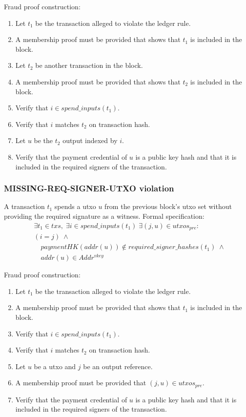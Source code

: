 \documentclass[../midgard.tex]{subfiles}
\begin{document}
Fraud proof construction:
\begin{enumerate}
  \item Let $t_1$ be the transaction alleged to violate the ledger rule.
  \item A membership proof must be provided that shows that $t_1$ is included in the block.
  \item Let $t_2$ be another transaction in the block.
  \item A membership proof must be provided that shows that $t_2$ is included in the block.
  \item Verify that $i \in spend\_inputs(t_1)$.
  \item Verify that $i$ matches $t_2$ on transaction hash. 
  \item Let $u$ be the $t_2$ output indexed by $i$. 
  \item Verify that the payment credential of $u$ is a public key hash and that it is included in the required signers of the transaction.
\end{enumerate}

\subsubsection{MISSING-REQ-SIGNER-UTXO violation}
\label{violation:MISSING-REQ-SIGNER-UTXO}
A transaction $t_1$ spends a utxo $u$ from the previous block's utxo set without providing the required signature as a witness.
Formal specification:
\begin{equation*}
\begin{split}
  &\exists t_1 \in txs,\; \exists i \in spend\_inputs(t_1)\; \exists (j,u) \in utxos_{pre} : \\
    &(i = j) \;\land\\
    &\quad paymentHK(addr(u)) \notin required\_signer\_hashes(t_1) \;\land\\
    &\quad addr(u) \in Addr^{vkey}
\end{split}
\end{equation*}

Fraud proof construction:
\begin{enumerate}
  \item Let $t_1$ be the transaction alleged to violate the ledger rule. 
  \item A membership proof must be provided that shows that $t_1$ is included in the block.
  \item Verify that $i \in spend\_inputs(t_1)$.
  \item Verify that $i$ matches $t_2$ on transaction hash. 
  \item Let $u$ be a utxo and $j$ be an output reference. 
  \item A membership proof must be provided that $(j,u) \in utxos_{pre}$.
  \item Verify that the payment credential of $u$ is a public key hash and that it is included in the required signers of the transaction.
\end{enumerate}
\end{document}
